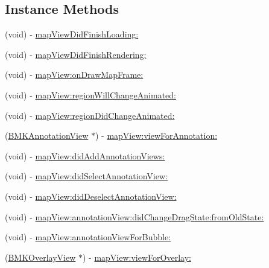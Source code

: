 \subsection*{Instance Methods}
\begin{DoxyCompactItemize}
\item 
(void) -\/ \hyperlink{protocol_b_m_k_map_view_delegate-p_afb277fb60e14f6b2cc4bf06dede22fdd}{map\+View\+Did\+Finish\+Loading\+:}
\item 
(void) -\/ \hyperlink{protocol_b_m_k_map_view_delegate-p_a0d5c4126c733a94e943c2bebe1e1abba}{map\+View\+Did\+Finish\+Rendering\+:}
\item 
(void) -\/ \hyperlink{protocol_b_m_k_map_view_delegate-p_a5918471c1fea23eae8bf7582c1fff17e}{map\+View\+:on\+Draw\+Map\+Frame\+:}
\item 
(void) -\/ \hyperlink{protocol_b_m_k_map_view_delegate-p_ae87e30d1d70dd4e8dcff06b5e0cf51a7}{map\+View\+:region\+Will\+Change\+Animated\+:}
\item 
(void) -\/ \hyperlink{protocol_b_m_k_map_view_delegate-p_a6639906de681668b08204765528ce825}{map\+View\+:region\+Did\+Change\+Animated\+:}
\item 
(\hyperlink{interface_b_m_k_annotation_view}{B\+M\+K\+Annotation\+View} $\ast$) -\/ \hyperlink{protocol_b_m_k_map_view_delegate-p_a58eb111045e3e124bcf8abba4d1188d5}{map\+View\+:view\+For\+Annotation\+:}
\item 
(void) -\/ \hyperlink{protocol_b_m_k_map_view_delegate-p_ad982960181ac5b4087f4087e06f16603}{map\+View\+:did\+Add\+Annotation\+Views\+:}
\item 
(void) -\/ \hyperlink{protocol_b_m_k_map_view_delegate-p_a825411129229ae80dbd104596c0d788a}{map\+View\+:did\+Select\+Annotation\+View\+:}
\item 
(void) -\/ \hyperlink{protocol_b_m_k_map_view_delegate-p_a8b3c67fbfebc7d7479a1935269d8302d}{map\+View\+:did\+Deselect\+Annotation\+View\+:}
\item 
(void) -\/ \hyperlink{protocol_b_m_k_map_view_delegate-p_add2407adba384f1dd3c0953590e4a60d}{map\+View\+:annotation\+View\+:did\+Change\+Drag\+State\+:from\+Old\+State\+:}
\item 
(void) -\/ \hyperlink{protocol_b_m_k_map_view_delegate-p_adf11fcfbabf17146fd10d24f5b70aaf2}{map\+View\+:annotation\+View\+For\+Bubble\+:}
\item 
(\hyperlink{interface_b_m_k_overlay_view}{B\+M\+K\+Overlay\+View} $\ast$) -\/ \hyperlink{protocol_b_m_k_map_view_delegate-p_a643e260b01350f089451d745574e3d72}{map\+View\+:view\+For\+Overlay\+:}

\end{DoxyCompactItemize}
